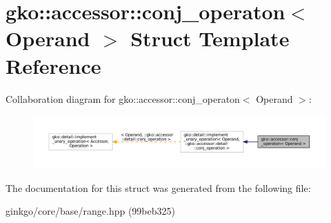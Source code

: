 \hypertarget{structgko_1_1accessor_1_1conj__operaton}{}\section{gko\+:\+:accessor\+:\+:conj\+\_\+operaton$<$ Operand $>$ Struct Template Reference}
\label{structgko_1_1accessor_1_1conj__operaton}


Collaboration diagram for gko\+:\+:accessor\+:\+:conj\+\_\+operaton$<$ Operand $>$\+:
\nopagebreak
\begin{figure}[H]
\begin{center}
\leavevmode
\includegraphics[width=350pt]{structgko_1_1accessor_1_1conj__operaton__coll__graph}
\end{center}
\end{figure}


The documentation for this struct was generated from the following file\+:\begin{DoxyCompactItemize}
\item 
ginkgo/core/base/range.\+hpp (99beb325)\end{DoxyCompactItemize}
